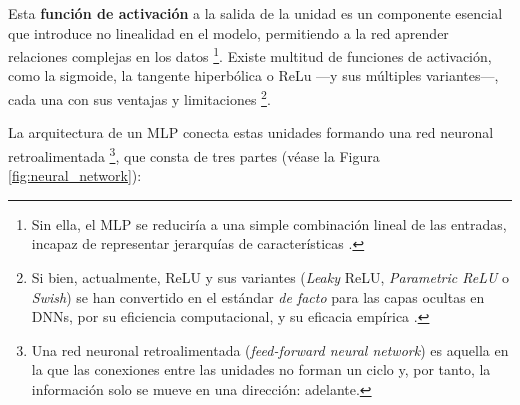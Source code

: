 Esta \textbf{función de activación} a la salida de la unidad es un componente esencial que introduce no 
linealidad en el modelo, permitiendo a la red aprender relaciones complejas en los datos
\footnote{
    Sin ella, el MLP se reduciría a una simple combinación lineal de las entradas, incapaz de
    representar jerarquías de características \cite{murphy2022}.
}.
Existe multitud de funciones de activación, como la sigmoide, la tangente hiperbólica o ReLu ---y sus 
múltiples variantes---, cada una con sus ventajas y limitaciones
\footnote{
    Si bien, actualmente, ReLU y sus variantes (\textit{Leaky} ReLU, \textit{Parametric ReLU} o 
    \textit{Swish}) se han convertido en el estándar \textit{de facto} para las capas ocultas en DNNs,
    por su eficiencia computacional, y su eficacia empírica \cite{vargas2021}.
}.

La arquitectura de un MLP conecta estas unidades formando una red neuronal retroalimentada
\footnote{
    Una red neuronal retroalimentada (\textit{feed-forward neural network}) es aquella en la que las 
    conexiones entre las unidades no forman un ciclo y, por tanto, la información solo se mueve en una 
    dirección: adelante.
},
que consta de tres partes (véase la Figura \ref{fig:neural_network}):

